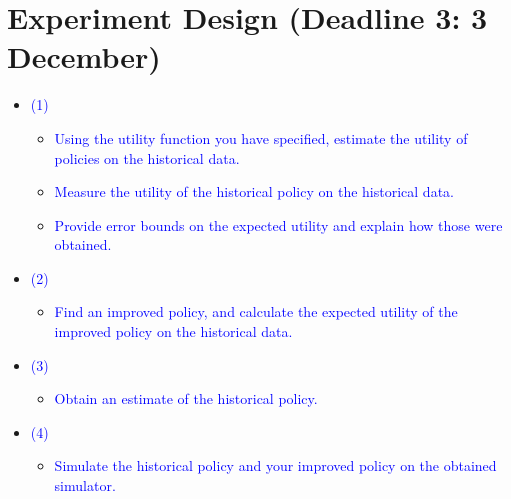 \documentclass[a4paper, 12pt]{extarticle}
\begin{document}
\section*{Experiment Design (Deadline 3: 3 December)}
\begin{itemize}
    \item \textcolor{blue}{(1)}
        \begin{itemize}
            \item \textcolor{blue}{Using the utility function you have specified, estimate the utility of policies on the historical data.}
            \item \textcolor{blue}{Measure the utility of the historical policy on the historical data.}
            \item \textcolor{blue}{Provide error bounds on the expected utility and explain how those were obtained.}
        \end{itemize}
    \item \textcolor{blue}{(2)}
        \begin{itemize}
            \item \textcolor{blue}{Find an improved policy, and calculate the expected utility of the improved policy on the historical data.}
        \end{itemize}
    \item \textcolor{blue}{(3)}
        \begin{itemize}
            \item \textcolor{blue}{Obtain an estimate of the historical policy.}
        \end{itemize}
    \item \textcolor{blue}{(4)}
        \begin{itemize}
            \item \textcolor{blue}{Simulate the historical policy and your improved policy on the obtained simulator.}
        \end{itemize}
\end{itemize}
\end{document}
